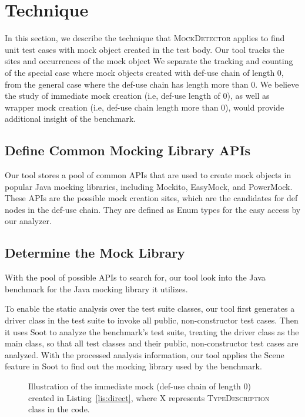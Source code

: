 \section{Technique}
\label{sec:technique}

In this section, we describe the technique that \textsc{MockDetector} applies to find unit test cases with mock object created in the test body. Our tool tracks the sites and occurrences of the mock object  We separate the tracking and counting of the special case where mock objects created with def-use chain of length 0, from the general case where the def-use chain has length more than 0. We believe the study of immediate mock creation (i.e, def-use length of 0), as well as wrapper mock creation (i.e, def-use chain length more than 0), would provide additional insight of the benchmark.

\subsection{Define Common Mocking Library APIs}
\label{subsec:collection}

Our tool stores a pool of common APIs that are used to create mock objects in popular Java mocking libraries, including Mockito, EasyMock, and PowerMock. These APIs are the possible mock creation sites, which are the candidates for def nodes in the def-use chain. They are defined as Enum types for the easy access by our analyzer. 

\subsection{Determine the Mock Library}
\label{subsec:library}

With the pool of possible APIs to search for, our tool look into the Java benchmark for the Java mocking library it utilizes. 

To enable the static analysis over the test suite classes, our tool first generates a driver class in the test suite to invoke all public, non-constructor test cases. Then it uses Soot to analyze the benchmark's test suite, treating the driver class as the main class, so that all test classes and their public, non-constructor test cases are analyzed. With the processed analysis information, our tool applies the Scene feature in Soot to find out the mocking library used by the benchmark.

\begin{figure}
	\centering
	
	\caption{Illustration of the immediate mock (def-use chain of length 0) created in Listing~\ref{lis:direct}, where \textsc{X} represents \textsc{TypeDescription} class in the code.} 
	\label{fig:immediate}
\end{figure}

